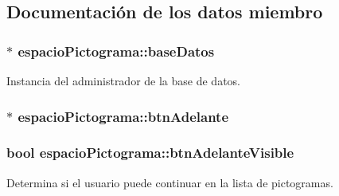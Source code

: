 \subsection{Documentación de los datos miembro}
\hypertarget{classespacio_pictograma_a2e1fdcb75a25332576f897e77d1fe2de}{}
\subsubsection[{base\+Datos}]{$\ast$ espacio\+Pictograma\+::base\+Datos\hspace{0.3cm}{\ttfamily [private]}}\label{classespacio_pictograma_a2e1fdcb75a25332576f897e77d1fe2de}


Instancia del administrador de la base de datos. 

\hypertarget{classespacio_pictograma_a9157dd34f8f48cd755f721b288369dfe}{}
\subsubsection[{btn\+Adelante}]{$\ast$ espacio\+Pictograma\+::btn\+Adelante\hspace{0.3cm}{\ttfamily [private]}}\label{classespacio_pictograma_a9157dd34f8f48cd755f721b288369dfe}
\hypertarget{classespacio_pictograma_aecebb0c47c0d28f31052d5084e02aec2}{}
\subsubsection[{btn\+Adelante\+Visible}]{\setlength{\rightskip}{0pt plus 5cm}bool espacio\+Pictograma\+::btn\+Adelante\+Visible\hspace{0.3cm}{\ttfamily [private]}}\label{classespacio_pictograma_aecebb0c47c0d28f31052d5084e02aec2}


Determina si el usuario puede continuar en la lista de pictogramas. 

\hypertarget{classespacio_pictograma_ae17417de4e3122b89c29119a320888f0}{}
